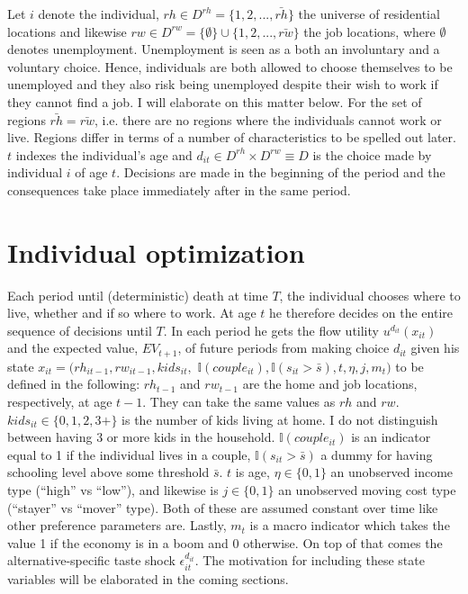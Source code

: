 Let $i$ denote the individual, $rh\in D^{rh}=\{1,2,...,\bar{rh}\}$ the universe of residential locations and likewise $rw \in D^{rw}=\{\emptyset\} \cup \{1,2,...,\bar{rw}\}$ the job locations, where $\emptyset$ denotes unemployment. Unemployment is seen as a both an involuntary and a voluntary choice. Hence, individuals are both allowed to choose themselves to be unemployed and they also risk being unemployed despite their wish to work if they cannot find a job. I will elaborate on this matter below. For the set of regions $\bar{rh}=\bar{rw}$, i.e. there are no regions where the individuals cannot work or live. Regions differ in terms of a number of characteristics to be spelled out later.  $t$ indexes the individual's age and $d_{it}\in D^{rh}\times D^{rw}\equiv D$ is the choice made by individual $i$ of age $t$. Decisions are made in the beginning of the period and the consequences take place immediately after in the same period. 


\section{Individual optimization}
Each period until (deterministic) death at time $T$, the individual chooses where to live, whether and if so where to work. At age $t$ he therefore decides on the entire sequence of decisions until $T$. In each period he gets the flow utility $u^{d_{it}}(x_{it})$ and the expected value, $EV_{t+1}$, of future periods from making choice $d_{it}$ given his state $x_{it}=(rh_{it-1},rw_{it-1},kids_{it},$ $\mathbb{I}({couple_{it}}),\mathbb{I}{(s_{it}>\bar{s})},t,\eta,j,m_t)$ to be defined in the following: $rh_{t-1}$ and $rw_{t-1}$ are the home and job locations, respectively, at age $t-1$. They can take the same values as $rh$ and $rw$. $kids_{it}\in \{0,1,2,3+ \}$ is the number of kids living at home. I do not distinguish between having 3 or more kids in the household.  $\mathbb{I}({couple_{it}})$ is an indicator equal to 1 if the individual lives in a couple, $\mathbb{I}{(s_{it}>\bar{s})}$ a dummy for having schooling level above some threshold $\bar{s}$. $t$ is age, $\eta\in \{0,1\}$ an unobserved income type (``high'' vs ``low''), and likewise is $j\in\{0,1\}$ an unobserved moving cost type (``stayer'' vs ``mover'' type). Both of these are assumed constant over time like other preference parameters are. Lastly, $m_t$ is a macro indicator which takes the value 1 if the economy is in a boom and 0 otherwise. On top of that comes the alternative-specific taste shock $\epsilon_{it}^{d_{it}}$. The motivation for including these state variables will be elaborated in the coming sections. 


